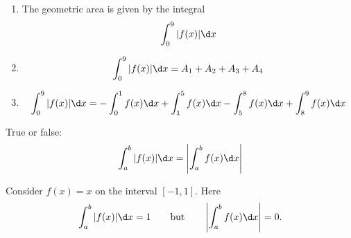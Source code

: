 \documentclass{ximera}
\begin{document}
\begin{example}
\begin{enumerate}
\begin{explanation}
\begin{enumerate}
\item The geometric area is given by the  integral
 \[
  \int_0^9 |f(x)| \d x 
  \]
  \item
   \[
  \int_0^9 |f(x)| \d x =A_1 +A_2+A_3+A_4
  \]
\item 
  \[
  \int_0^9 |f(x)| \d x = -\int_0^1 f(x) \d x+ \int_1^5 f(x) \d x- \int_5^8 f(x) \d x+ \int_8^9 f(x) \d x
  \]
 \end{enumerate}
\end{explanation}
 \end{enumerate}
\end{example}
\begin{question}
  True or false:
  \[
  \int_a^b |f(x)| \d x = \left|\int_a^b f(x) \d x\right|
  \]
  \begin{multipleChoice}
  \end{multipleChoice}
  \begin{feedback}
    Consider $f(x) = x$ on the interval $[-1,1]$. Here
    \[
    \int_a^b |f(x)| \d x = 1 \qquad\text{but}\qquad \left|\int_a^b
    f(x) \d x\right| = 0.
    \]
  \end{feedback}
\end{question}
\end{document}
